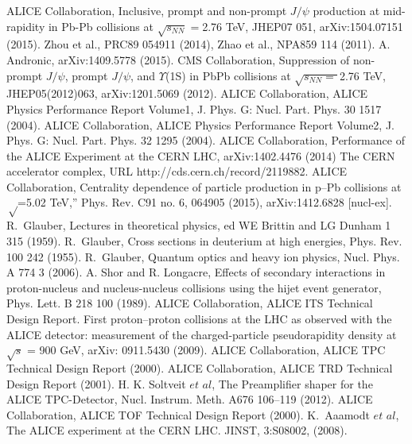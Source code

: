 \begin{thebibliography}{4}
 ALICE Collaboration, Inclusive, prompt and non-prompt $J/\psi$ production at mid-rapidity in Pb-Pb collisions at $\sqrt{s_{NN}}=$2.76 TeV, JHEP07 051,  arXiv:1504.07151 (2015).
 Zhou et al., PRC89 054911 (2014), Zhao et al., NPA859 114 (2011).
 A. Andronic, arXiv:1409.5778 (2015). 
 CMS Collaboration, Suppression of non-prompt $J/\psi$, prompt $J/\psi$, and $\Upsilon$(1S) in PbPb collisions at $\sqrt{s_{NN}=}$2.76 TeV, JHEP05(2012)063, arXiv:1201.5069 (2012).
 ALICE Collaboration, ALICE Physics Performance Report Volume1,  J. Phys. G: Nucl. Part. Phys. 30 1517 (2004).
 ALICE Collaboration, ALICE Physics Performance Report Volume2,  J. Phys. G: Nucl. Part. Phys. 32 1295 (2004). 
 ALICE Collaboration, Performance of the ALICE Experiment at the CERN LHC,  arXiv:1402.4476 (2014)
 The CERN accelerator complex, URL http://cds.cern.ch/record/2119882.
 ALICE Collaboration, Centrality dependence of particle production in p–Pb collisions at $\sqrt$=5.02 TeV,” Phys. Rev. C91 no. 6, 064905 (2015), arXiv:1412.6828 [nucl-ex].
 R.~Glauber, Lectures in theoretical physics, ed WE Brittin and LG Dunham 1 315 (1959).
 R.~Glauber, Cross sections in deuterium at high energies, Phys. Rev. 100 242 (1955).
 R.~Glauber, Quantum optics and heavy ion physics, Nucl. Phys. A 774 3 (2006).
 A. Shor and R. Longacre, Effects of secondary interactions in proton-nucleus and nucleus-nucleus collisions using the hijet event generator, Phys. Lett. B 218 100 (1989).
 ALICE Collaboration, ALICE ITS Technical Design Report.
 First proton–proton collisions at the LHC as observed with the ALICE detector: measurement of the charged-particle pseudorapidity density at $\sqrt{s}$ = 900 GeV, arXiv: 0911.5430 (2009).
 ALICE Collaboration, ALICE TPC Technical Design Report (2000).
 ALICE Collaboration, ALICE TRD Technical Design Report (2001).
 H. K. Soltveit $et$ $al$, The Preamplifier shaper for the ALICE TPC-Detector, Nucl. Instrum. Meth. A676 106–119 (2012).%
 ALICE Collaboration, ALICE TOF Technical Design Report (2000).
 K.~Aaamodt $et$ $al$,  The ALICE experiment at the CERN LHC. JINST, 3:S08002, (2008).

\end{thebibliography}

